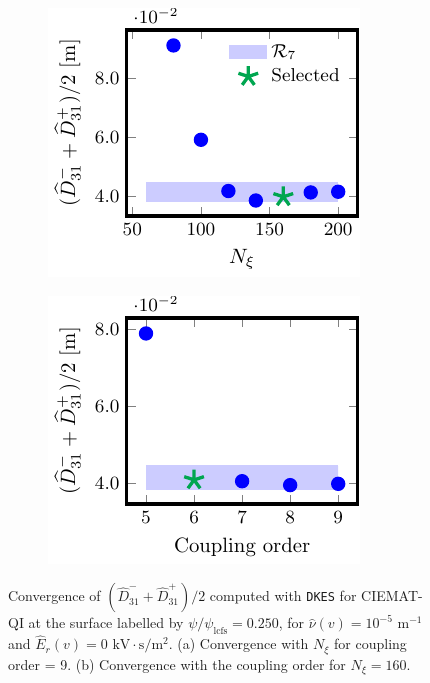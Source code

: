 \documentclass[10pt]{iopart}
\newcommand{\DKES}{{\texttt{DKES}}}
\begin{document}
\begin{figure}[t]
	\centering	
	\begin{subfigure}[t]{0.32\textwidth}
		\includegraphics{DKES-Convergence-Legendre-CIEMAT-QI-s0250-Er-0-D31-Detail}
		\caption{}
		\label{subfig:DKES_D31_convergence_Legendre_CIEMAT_QI_0250_Erho_0_Detail}
	\end{subfigure}
	\begin{subfigure}[t]{0.32\textwidth}
		\includegraphics{DKES-Convergence-theta-zeta-CIEMAT-QI-s0250-Er-0-D31}
		\caption{}
		\label{subfig:DKES_D31_convergence_Coupling_parameter_CIEMAT_QI_0250_Erho_0}
	\end{subfigure}
	
	
	\caption{Convergence of $(\widehat{D}_{31}^- + \widehat{D}_{31}^+) /2$ computed with {\DKES} for CIEMAT-QI at the surface labelled by $\psi/\psi_{\text{lcfs}}=0.250$, for $\hat{\nu}(v)=10^{-5}$ $\text{m}^{-1}$ and $\widehat{E}_r(v)=0$ $\text{kV}\cdot\text{s}/\text{m}^2$. (a) Convergence with $N_\xi$ for coupling order = 9. (b) Convergence with the coupling order for $N_\xi= 160$.}
	\label{fig:DKES_Convergence_CIEMAT_QI_Er_0}
\end{figure}
\end{document}
